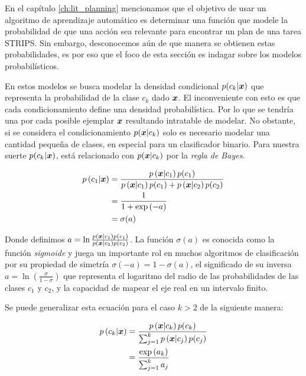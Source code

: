 En el capítulo \ref{ch:lit_planning} mencionamos que el objetivo de usar un algoritmo de aprendizaje
automático es determinar una función que modele la probabilidad
de que una acción sea relevante para encontrar un plan de una tarea STRIPS. Sin
embargo, desconocemos aún de que manera se obtienen estas probabilidades, es por
eso que el foco de esta sección es indagar sobre los modelos probabilísticos.

En estos modelos se busca modelar la densidad condicional $p(c_k | \boldsymbol{x})$ que
representa la probabilidad de la clase $c_k$ dado $\boldsymbol{x}$. El inconveniente con
esto es que cada condicionamiento define una densidad probabilística. Por lo que
se tendría una por cada posible ejemplar $\boldsymbol{x}$ resultando intratable de
modelar. No obstante, si se considera el condicionamiento $p(\boldsymbol{x} | c_k)$
solo es necesario modelar una cantidad pequeña de clases, en especial para un
clasificador binario. Para nuestra suerte $p(c_k | \boldsymbol{x})$, está relacionado
con $p(\boldsymbol{x} | c_k)$ por la \emph{regla de Bayes}.

\begin{align}
    p\left( c_1 | \boldsymbol{x} \right) &= \frac{p\left( \boldsymbol{x} | c_1 \right)p(c_1)}{
                                            p\left( \boldsymbol{x} | c_1 \right) p(c_1) + 
                                            p\left( \boldsymbol{x} | c_2 \right)p(c_2)} \\
                                   &= \frac{1}{1 + \exp\left( -a \right)} \\
                                   &= \sigma(a)
\end{align}

Donde definimos $a = \ln \frac{p\left( \boldsymbol{x} | c_1 \right) p\left( c_1
\right)}{p\left( \boldsymbol{x} | c_2 \right) p\left( c_2 \right)}$. La función
$\sigma(a)$ es conocida como la función \emph{sigmoide} y juega un importante
rol en muchos algoritmos de clasificación por su propiedad de simetría
$\sigma(-a) = 1 - \sigma(a)$, el significado de su inversa $a = \ln \left(
\frac{\sigma}{1 - \sigma} \right)$ que representa el logaritmo del radio de las
probabilidades de las clases $c_1$ y $c_2$, y la capacidad de mapear el eje real
en un intervalo finito.

Se puede generalizar esta ecuación para el caso $k > 2$ de la siguiente manera:

\begin{align}
    p\left( c_k | \boldsymbol{x} \right) &= \frac{p\left( \boldsymbol{x} | c_k \right)p(c_k)}{
                                                \sum_{j=1}^{k} p\left( \boldsymbol{x} |
                                                c_j \right) p(c_j) } \\
                                       &= \frac{\exp\left( a_k \right)}{\sum_{j=1}^{k} a_j} \\
\end{align}

